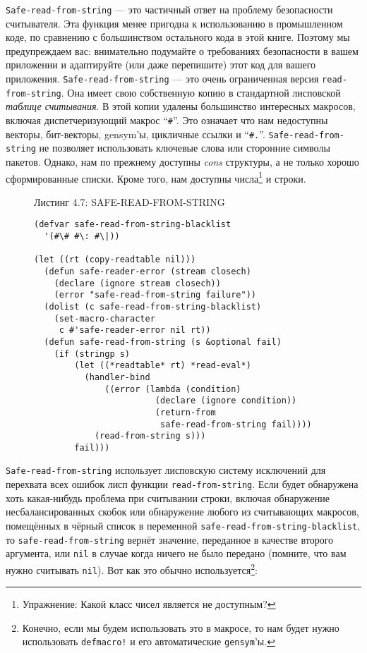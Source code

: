 \verb"Safe-read-from-string" --- это частичный ответ на проблему безопасности считывателя. Эта функция менее пригодна к использованию в промышленном коде, по сравнению с большинством остального кода в этой книге. Поэтому мы предупреждаем вас: внимательно подумайте о требованиях безопасности в вашем приложении и адаптируйте (или даже перепишите) этот код для вашего приложения. \verb"Safe-read-from-string" --- это очень ограниченная версия \verb"read-from-string". Она имеет свою собственную копию в стандартной лисповской \emph{таблице считывания}. В этой копии удалены большинство интересных макросов, включая диспетчеризующий макрос ``\verb"#"''. Это означает что нам недоступны векторы, бит-векторы, gensym'ы, цикличные ссылки и ``\verb"#."''. \verb"Safe-read-from-string" не позволяет использовать ключевые слова или сторонние символы пакетов. Однако, нам по прежнему доступны \emph{cons} структуры, а не только хорошо сформированные списки. Кроме того, нам доступны числа\footnote{Упражнение: Какой класс чисел является не доступным?} и строки.

\begin{figure}Листинг 4.7: SAFE-READ-FROM-STRING\label{listing_4.7}
\listbegin
\begin{verbatim}
(defvar safe-read-from-string-blacklist
  '(#\# #\: #\|))

(let ((rt (copy-readtable nil)))
  (defun safe-reader-error (stream closech)
    (declare (ignore stream closech))
    (error "safe-read-from-string failure"))
  (dolist (c safe-read-from-string-blacklist)
    (set-macro-character
     c #'safe-reader-error nil rt))
  (defun safe-read-from-string (s &optional fail)
    (if (stringp s)
        (let ((*readtable* rt) *read-eval*)
          (handler-bind
              ((error (lambda (condition)
                        (declare (ignore condition))
                        (return-from
                         safe-read-from-string fail))))
            (read-from-string s)))
        fail)))
\end{verbatim}
\listend
\end{figure}

\verb"Safe-read-from-string" использует лисповскую систему исключений для перехвата всех ошибок лисп функции \verb"read-from-string". Если будет обнаружена хоть какая-нибудь проблема при считывании строки, включая обнаружение несбалансированных скобок или обнаружение любого из считывающих макросов, помещённых в чёрный список в переменной \verb"safe-read-from-string-blacklist", то \verb"safe-read-from-string" вернёт значение, переданное в качестве второго аргумента, или \verb"nil" в случае когда ничего не было передано (помните, что вам нужно считывать \verb"nil"). Вот как это обычно используется\footnote{Конечно, если мы будем использовать это в макросе, то нам будет нужно использовать \verb"defmacro!" и его автоматические \verb"gensym"'ы.}:


